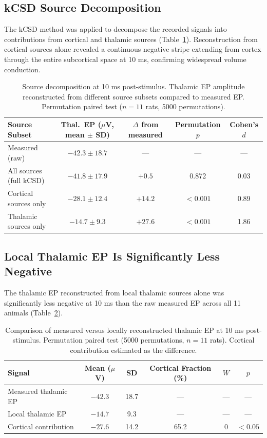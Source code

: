 \documentclass[11pt]{article}
\begin{document}
\subsection{kCSD Source Decomposition}

The kCSD method was applied to decompose the recorded signals into contributions from cortical and thalamic sources (Table~\ref{tab:decomposition}). Reconstruction from cortical sources alone revealed a continuous negative stripe extending from cortex through the entire subcortical space at 10 ms, confirming widespread volume conduction.

\begin{table}[H]
\centering
\caption{Source decomposition at 10 ms post-stimulus. Thalamic EP amplitude reconstructed from different source subsets compared to measured EP. Permutation paired test ($n = 11$ rats, 5000 permutations).}
\label{tab:decomposition}
\begin{tabular}{lcccc}
\toprule
\textbf{Source Subset} & \textbf{Thal.\ EP ($\mu$V, mean $\pm$ SD)} & \textbf{$\Delta$ from measured} & \textbf{Permutation $p$} & \textbf{Cohen's $d$} \\
\midrule
Measured (raw) & $-42.3 \pm 18.7$ & --- & --- & --- \\
All sources (full kCSD) & $-41.8 \pm 17.9$ & $+0.5$ & 0.872 & 0.03 \\
Cortical sources only & $-28.1 \pm 12.4$ & $+14.2$ & $< 0.001$ & 0.89 \\
Thalamic sources only & $-14.7 \pm 9.3$ & $+27.6$ & $< 0.001$ & 1.86 \\
\bottomrule
\end{tabular}
\end{table}

\subsection{Local Thalamic EP Is Significantly Less Negative}

The thalamic EP reconstructed from local thalamic sources alone was significantly less negative at 10 ms than the raw measured EP across all 11 animals (Table~\ref{tab:local_vs_measured}).

\begin{table}[H]
\centering
\caption{Comparison of measured versus locally reconstructed thalamic EP at 10 ms post-stimulus. Permutation paired test (5000 permutations, $n = 11$ rats). Cortical contribution estimated as the difference.}
\label{tab:local_vs_measured}
\begin{tabular}{lccccc}
\toprule
\textbf{Signal} & \textbf{Mean ($\mu$V)} & \textbf{SD} & \textbf{Cortical Fraction (\%)} & \textbf{$W$} & \textbf{$p$} \\
\midrule
Measured thalamic EP & $-42.3$ & 18.7 & --- & --- & --- \\
Local thalamic EP & $-14.7$ & 9.3 & --- & --- & --- \\
Cortical contribution & $-27.6$ & 14.2 & 65.2 & 0 & $< 0.05$ \\
\bottomrule
\end{tabular}
\end{table}
\end{document}
